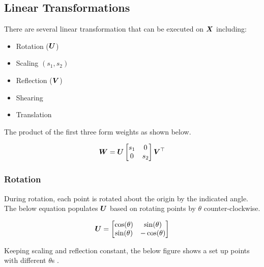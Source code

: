 \subsection{Linear Transformations}
There are several linear transformation that can be executed on $\bm{X}$ including:

\begin{itemize}
\item
Rotation (\(\bm{U}\))

\item
Scaling \((s_1, s_2)\)

\item
Reflection (\(\bm{V}\))
\item
Shearing
\item
Translation
\end{itemize}

The product of the first three form weights as shown below.

\[
\bm{W} = \bm{U}
\begin{bmatrix}
    s_1 & 0 \\
    0 & s_2 
\end{bmatrix}
\bm{V}^\top
\]


\subsubsection{Rotation}
During rotation, each point is rotated about the origin by the indicated angle. 
The below equation populates $\bm{U}$ based on rotating points by \(\theta\) counter-clockwise.

\[
\bm{U} = 
\begin{bmatrix}
    \cos(\theta) & \sin(\theta)\\
    \sin(\theta) & -\cos(\theta)
\end{bmatrix}
\]

Keeping scaling and reflection constant, the below figure shows a set up points with different  \(\theta\)s .

